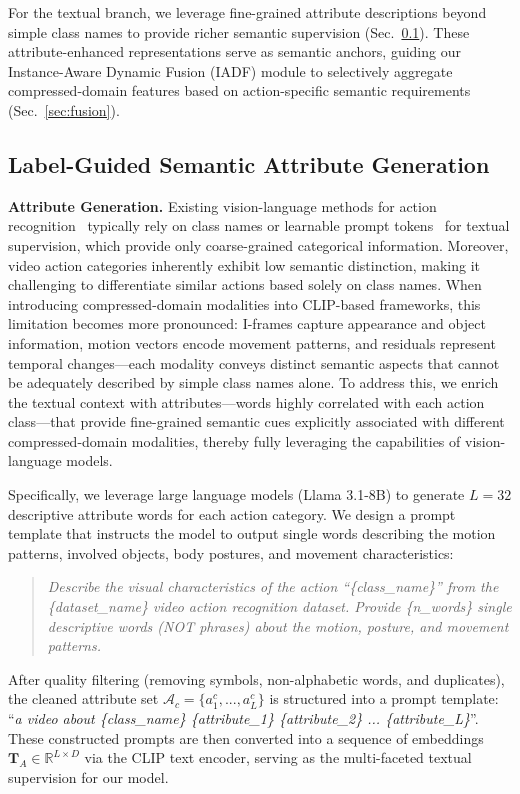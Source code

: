 \documentclass[letterpaper]{article} %
\begin{document}
For the textual branch, we leverage fine-grained attribute descriptions beyond simple class names to provide richer semantic supervision (Sec.~\ref{sec:attribute}). These attribute-enhanced representations serve as semantic anchors, guiding our Instance-Aware Dynamic Fusion (IADF) module to selectively aggregate compressed-domain features based on action-specific semantic requirements (Sec.~\ref{sec:fusion}).

\subsection{Label-Guided Semantic Attribute Generation}
\label{sec:attribute}

\noindent\textbf{Attribute Generation.} 
Existing vision-language methods for action recognition~\cite{wang2021actionclipnewparadigmvideo,ni2022expanding} typically rely on class names or learnable prompt tokens~\cite{zhou2022learning} for textual supervision, which provide only coarse-grained categorical information. Moreover, video action categories inherently exhibit low semantic distinction, making it challenging to differentiate similar actions based solely on class names. When introducing compressed-domain modalities into CLIP-based frameworks, this limitation becomes more pronounced: I-frames capture appearance and object information, motion vectors encode movement patterns, and residuals represent temporal changes---each modality conveys distinct semantic aspects that cannot be adequately described by simple class names alone. To address this, we enrich the textual context with attributes---words highly correlated with each action class---that provide fine-grained semantic cues explicitly associated with different compressed-domain modalities, thereby fully leveraging the capabilities of vision-language models.

Specifically, we leverage large language models (Llama 3.1-8B) to generate $L=32$ descriptive attribute words for each action category. We design a prompt template that instructs the model to output single words describing the motion patterns, involved objects, body postures, and movement characteristics:
\begin{quote}
\textit{Describe the visual characteristics of the action ``\{class\_name\}'' from the \{dataset\_name\} video action recognition dataset. Provide \{n\_words\} single descriptive words (NOT phrases) about the motion, posture, and movement patterns.}
\end{quote}
After quality filtering (removing symbols, non-alphabetic words, and duplicates), the cleaned attribute set $\mathcal{A}_c = \{a_1^c, ..., a_L^c\}$ is structured into a prompt template: ``\textit{a video about \{class\_name\} \{attribute\_1\} \{attribute\_2\} ... \{attribute\_L\}}''. These constructed prompts are then converted into a sequence of embeddings $\mathbf{T}_A \in \mathbb{R}^{L \times D}$ via the CLIP text encoder, serving as the multi-faceted textual supervision for our model.
\end{document}
